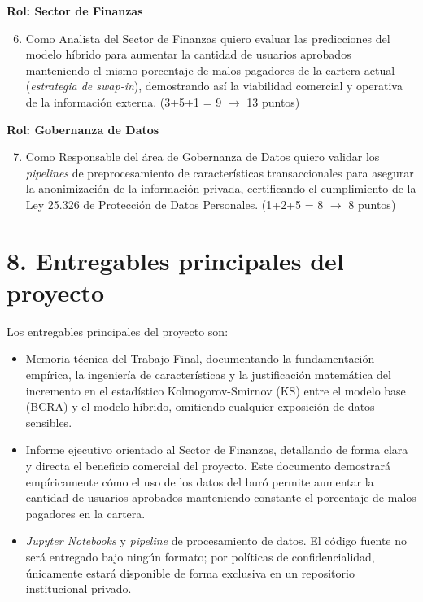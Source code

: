 \documentclass[
11pt, %
codirector, %
]{charter}
\begin{document}
\textbf{Rol: Sector de Finanzas}
\begin{enumerate}\setcounter{enumi}{5}
    \item Como Analista del Sector de Finanzas quiero evaluar las predicciones del modelo híbrido para aumentar la cantidad de usuarios aprobados manteniendo el mismo porcentaje de malos pagadores de la cartera actual (\textit{estrategia de swap-in}), demostrando así la viabilidad comercial y operativa de la información externa. (3+5+1 = 9 $\rightarrow$ 13 puntos)
\end{enumerate}

\textbf{Rol: Gobernanza de Datos}
\begin{enumerate}\setcounter{enumi}{6}
    \item Como Responsable del área de Gobernanza de Datos quiero validar los \textit{pipelines} de preprocesamiento de características transaccionales para asegurar la anonimización de la información privada, certificando el cumplimiento de la Ley 25.326 de Protección de Datos Personales. (1+2+5 = 8 $\rightarrow$ 8 puntos)
\end{enumerate}

\section{8. Entregables principales del proyecto}
\label{sec:entregables}

Los entregables principales del proyecto son:
\begin{itemize}
    \item Memoria técnica del Trabajo Final, documentando la fundamentación empírica, la ingeniería de características y la justificación matemática del incremento en el estadístico Kolmogorov-Smirnov (KS) entre el modelo base (BCRA) y el modelo híbrido, omitiendo cualquier exposición de datos sensibles.
    \item Informe ejecutivo orientado al Sector de Finanzas, detallando de forma clara y directa el beneficio comercial del proyecto. Este documento demostrará empíricamente cómo el uso de los datos del buró permite aumentar la cantidad de usuarios aprobados manteniendo constante el porcentaje de malos pagadores en la cartera.
    \item \textit{Jupyter Notebooks} y \textit{pipeline} de procesamiento de datos. El código fuente no será entregado bajo ningún formato; por políticas de confidencialidad, únicamente estará disponible de forma exclusiva en un repositorio institucional privado.
\end{itemize}
\end{document}

